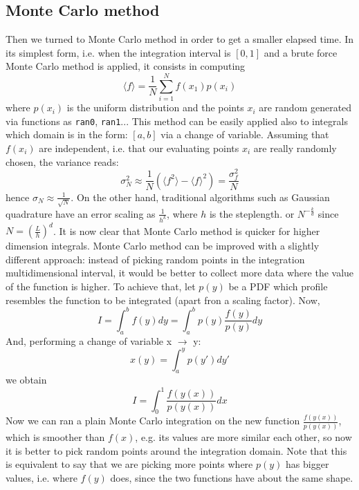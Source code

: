 \documentclass[10pt,a4paper,titlepage]{article}
\begin{document}
\subsection{Monte Carlo method}
Then we turned to Monte Carlo method in order to get a smaller elapsed time. 
In its simplest form, i.e. when the integration interval is $[0,1]$ and a brute force Monte Carlo method is applied, it consists in computing
\begin{equation}
\langle f \rangle= \frac{1}{N} \sum_{i=1}^{N}f(x_{1})p(x_{i})
\end{equation}
where $p(x_{i})$ is the uniform distribution and the points $x_{i}$ are random generated via functions as \texttt{ran0}, \texttt{ran1}...
This method can be easily applied also to integrals which domain is in the form: $[a,b]$ via a change of variable.
Assuming that $f(x_{i})$ are independent, i.e. that our evaluating points $x_{i}$ are really randomly chosen, the variance reads:
\begin{equation}
\sigma^{2}_{N} \approx \frac{1}{N} (\langle f^{2} \rangle-\langle f \rangle^{2})= \frac{\sigma^{2}_{f}}{N}
\end{equation}
hence $\sigma_{N}\approx\frac{1}{\sqrt{N}}$.
On the other hand, traditional algorithms such as Gaussian quadrature have an error scaling as $\frac{1}{h^{k}}$, where $h$ is the steplength. or $N^{-\frac{k}{d}}$ since $N=(\frac{L}{h})^{d}$. It is now clear that Monte Carlo method is quicker for higher dimension integrals.
Monte Carlo method can be improved with a slightly different approach: instead of picking random points in the integration multidimensional interval, it would be better to collect more data where the value of the function is higher. To achieve that, let $p(y)$ be a PDF which profile resembles the function to be integrated (apart fron a scaling factor). Now,
\begin{equation}
I=\int_{a}^{b}f(y)dy=\int_{a}^{b}p(y)\frac{f(y)}{p(y)}dy
\end{equation}
And, performing a change of variable x $\rightarrow$ y:
\begin{equation}
x(y)=\int_{a}^{y}p(y')dy'
\end{equation}
we obtain 
\begin{equation}
I=\int_{0}^{1}\frac{f(y(x))}{p(y(x))}dx
\end{equation}
Now we can ran a plain Monte Carlo integration on the new function $\frac{f(y(x))}{p(y(x))}$, which is smoother than $f(x)$, e.g. its values are more similar each other, so now it is better to pick random points around the integration domain. Note that this is equivalent to say that we are picking more points where $p(y)$ has bigger values, i.e. where $f(y)$ does, since the two functions have about the same shape.
\newpage
\end{document}
